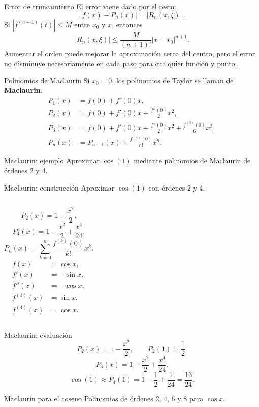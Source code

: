\documentclass[main.tex]{subfiles}
\begin{document}
\begin{frame}[t]{Error de truncamiento}
El error viene dado por el resto:
\[|f(x)-P_n(x)|=|R_n(x,\xi)|.\]
Si $|f^{(n+1)}(t)|\le M$ entre $x_0$ y $x$, entonces
\[|R_n(x,\xi)|\le\frac{M}{(n+1)!}|x-x_0|^{n+1}.\]
Aumentar el orden puede mejorar la aproximación cerca del centro, pero el error no disminuye necesariamente en cada paso para cualquier función y punto.
\end{frame}
\begin{frame}[t]{Polinomios de Maclaurin}
\small Si $x_0=0$, los polinomios de Taylor se llaman de \textbf{Maclaurin}.
\begin{align*}
P_1(x)&=f(0)+f'(0)x,\\
P_2(x)&=f(0)+f'(0)x+\frac{f''(0)}{2}x^2,\\
P_3(x)&=f(0)+f'(0)x+\frac{f''(0)}{2}x^2+\frac{f^{(3)}(0)}{6}x^3,\\
P_n(x)&=P_{n-1}(x)+\frac{f^{(n)}(0)}{n!}x^n.
\end{align*}
\end{frame}
\begin{frame}[t]{Maclaurin: ejemplo}
Aproximar $\cos(1)$ mediante polinomios de Maclaurin de órdenes 2 y 4.
\end{frame}
\begin{frame}[t]{Maclaurin: construcción}
\small Aproximar $\cos(1)$ con órdenes 2 y 4.
\begin{columns}[T]
\[P_2(x)=1-\frac{x^2}{2}.\]
\[P_4(x)=1-\frac{x^2}{2}+\frac{x^4}{24}.\]
\[P_n(x)=\sum_{k=0}^n\frac{f^{(k)}(0)}{k!}x^k.\]
\begin{align*}f(x)&=\cos x,\\f'(x)&=-\sin x,\\f''(x)&=-\cos x,\\f^{(3)}(x)&=\sin x,\\f^{(4)}(x)&=\cos x.\end{align*}
\end{columns}
\end{frame}
\begin{frame}[t]{Maclaurin: evaluación}
\[P_2(x)=1-\frac{x^2}{2},\qquad P_2(1)=\frac12.\]
\[P_4(x)=1-\frac{x^2}{2}+\frac{x^4}{24}.\]
\[\cos(1)\approx P_4(1)=1-\frac12+\frac1{24}=\frac{13}{24}.\]
\end{frame}
\begin{frame}[t]{Maclaurin para el coseno}
\small Polinomios de órdenes 2, 4, 6 y 8 para $\cos x$.\begin{columns}\end{columns}
\end{frame}
\end{document}
